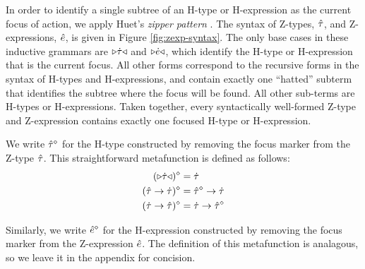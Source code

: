 \documentclass{llncs}
\begin{document}
In order to identify a single subtree of an H-type or H-expression as the current focus of action, we apply Huet's \emph{zipper pattern} \cite{JFP::Huet1997}. The syntax of Z-types, $\hat{\tau}$, and Z-expressions, $\hat{e}$, is given in Figure \ref{fig:zexp-syntax}. The only base cases in these inductive grammars are ${\triangleright}{\dot{\tau}}{\triangleleft}$ and ${\triangleright}{\dot{e}}{\triangleleft}$, which identify the H-type or H-expression that is the current focus. All other forms correspond to the recursive forms in the syntax of H-types and H-expressions, and contain exactly one ``hatted'' subterm that identifies the subtree where the focus will be found. All other sub-terms are H-types or H-expressions. Taken together, every syntactically well-formed Z-type and Z-expression contains exactly one focused H-type or H-expression.

We write $\hat{\tau}^{\diamond}$ for the H-type constructed by removing the focus marker from the Z-type $\hat{\tau}$. This straightforward metafunction is defined as follows:
\begin{align*}
({\triangleright}{\dot{\tau}}{\triangleleft})^{\diamond} & = \dot{\tau}\\
(\hat{\tau} \rightarrow \dot{\tau})^{\diamond} & = \hat{\tau}^{\diamond} \rightarrow \dot{\tau}\\
(\dot{\tau} \rightarrow \hat{\tau})^{\diamond} & = \dot{\tau} \rightarrow \hat{\tau}^{\diamond}
\end{align*}

Similarly, we write $\hat{e}^{\diamond}$ for the H-expression constructed by removing the focus marker from the Z-expression $\hat{e}$. The definition of this metafunction is analagous, so we leave it in the appendix for concision.
\end{document}
